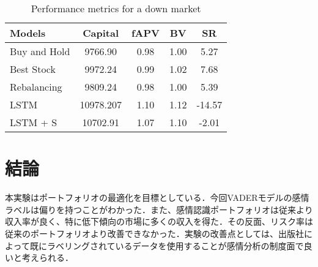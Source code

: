 \documentclass[submit,techrep,noauthor]{ipsj}
\begin{document}
\begin{table}[htb] %
\caption{Performance metrics for a down market} %
\label{release} %
\begin{center}
\begin{tabular}{| l | c | c  | c | c |} \hline %
Models & Capital & fAPV &BV & SR  \\ \hline %
Buy and Hold & 9766.90 & 0.98 & 1.00 &  5.27 \\ 
Best Stock &9972.24 &0.99& 1.02 & 7.68 \\
Rebalancing  &9809.24 &  0.98 & 1.00&  5.39\\
LSTM  & 10978.207  &1.10& 1.12 & -14.57\\
LSTM + S  & 10702.91 &1.07 & 1.10 & -2.01\\ \hline
\end{tabular}
\end{center}
\end{table}

\section{結論}
本実験はポートフォリオの最適化を目標としている．今回VADERモデルの感情ラベルは偏りを持つことがわかった．また、感情認識ポートフォリオは従来より収入率が良く、特に低下傾向の市場に多くの収入を得た．その反面、リスク率は従来のポートフォリオより改善できなかった．実験の改善点としては、出版社によって既にラベリングされているデータを使用することが感情分析の制度面で良いと考えられる．


\end{document}

